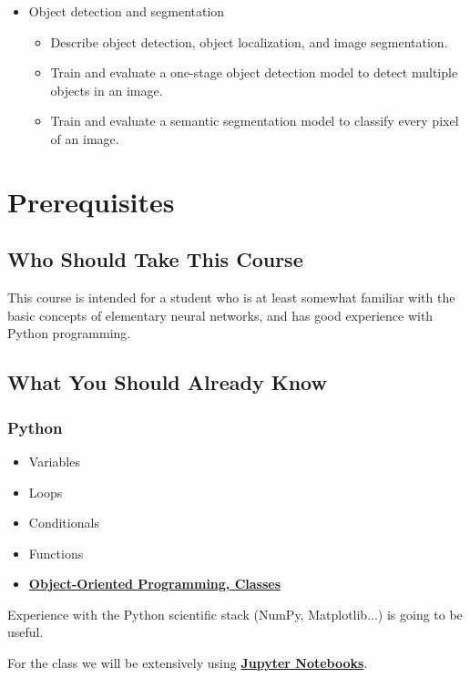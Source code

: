 \begin{itemize}
    \item Object detection and segmentation

\begin{itemize}
        \item Describe object detection, object localization, and image segmentation.
        \item Train and evaluate a one-stage object detection model to detect multiple objects in an image.
        \item Train and evaluate a semantic segmentation model to classify every pixel of an image.
\end{itemize}

\end{itemize}


\section{Prerequisites}

\subsection{Who Should Take This Course}

This course is intended for a student who is at least somewhat familiar with the basic concepts of elementary neural networks, and has good experience with Python programming.

\subsection{What You Should Already Know}

\subsubsection{Python}

\begin{itemize}
    \item Variables
    \item Loops
    \item Conditionals
    \item Functions
    \item \href{https://realpython.com/python3-object-oriented-programming/}{\textbf{Object-Oriented Programming, Classes}}
\end{itemize}
Experience with the Python scientific stack (NumPy, Matplotlib...) is going to be useful.

For the class we will be extensively using \href{https://tacc.github.io/CSC2017Institute/docs/day1/jupyter.html}{\textbf{Jupyter Notebooks}}.

